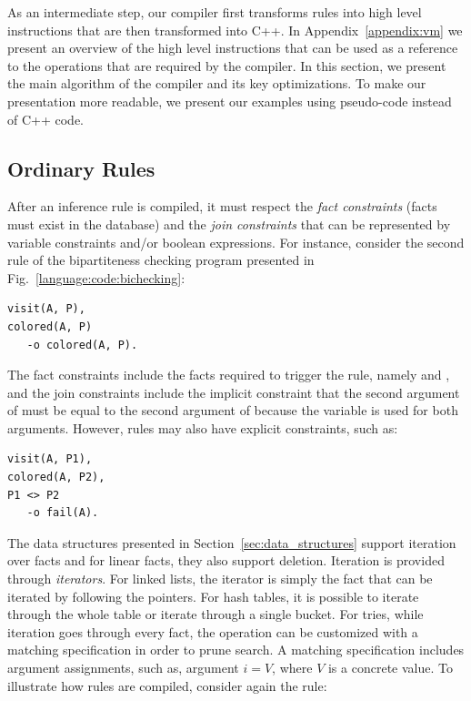 As an intermediate step, our compiler first transforms rules into high level
instructions that are then transformed into C++. In Appendix~\ref{appendix:vm}
we present an overview of the high level instructions that can be used as a
reference to the operations that are required by the compiler. In this section,
we present the main algorithm of the compiler and its key optimizations. To make
our presentation more readable, we present our examples using pseudo-code
instead of C++ code.

\subsection{Ordinary Rules}\label{sec:compile}

After an inference rule is compiled, it must respect the \emph{fact constraints}
(facts must exist in the database) and the \emph{join constraints} that can be
represented by variable constraints and/or boolean expressions. For instance,
consider the second rule of the bipartiteness checking program presented in
Fig.~\ref{language:code:bichecking}:

\begin{Verbatim}[fontsize=\codesize]
visit(A, P),
colored(A, P)
   -o colored(A, P).
\end{Verbatim}

The fact constraints include the facts required to trigger the rule, namely
 and , and the join constraints include
the implicit constraint that the second argument of  must be equal
to the second argument of  because the variable  is used
for both arguments. However, rules may also have explicit constraints, such as:

\begin{Verbatim}[fontsize=\codesize]
visit(A, P1),
colored(A, P2),
P1 <> P2
   -o fail(A).
\end{Verbatim}

The data structures presented in Section~\ref{sec:data_structures} support
iteration over facts and for linear facts, they also support deletion. Iteration
is provided through \emph{iterators}. For linked lists, the iterator is simply
the fact that can be iterated by following the  pointers. For hash
tables, it is possible to iterate through the whole table or iterate through a
single bucket. For tries, while iteration goes through every fact, the operation
can be customized with a matching specification in order to prune search. A
matching specification includes argument assignments, such as, argument $i = V$,
where $V$ is a concrete value.  To illustrate how rules are compiled, consider
again the rule:

